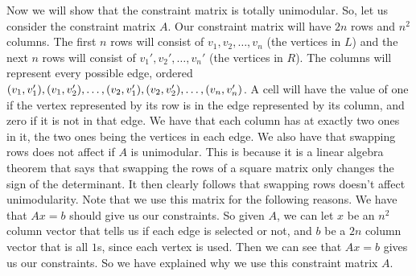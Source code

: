\documentclass{article}
\begin{document}
\begin{description}
        Now we will show that the constraint matrix is totally unimodular. So,
        let us consider the constraint matrix $A$. Our constraint matrix will
        have $2n$ rows and $n^2$ columns. The first $n$ rows will consist of
        $v_1, v_2, \dots, v_n$ (the vertices in $L$) and the next $n$ rows will consist of
        $v_1', v_2', \dots, v_n'$ (the vertices in $R$). The columns will represent
        every possible edge, ordered $(v_1, v_1'), (v_1, v_2'), \dots, (v_2,
        v_1'), (v_2, v_2'), \\* \dots, (v_n, v_n')$. A cell will have the value of one if
        the vertex represented by its row is in the edge represented by its
        column, and zero if it is not in that edge. We have that each column has
        at exactly two ones in it, the two ones being the vertices in each edge.
        We also have that swapping rows does not affect
        if $A$ is unimodular. This is because it is a linear algebra theorem that says that
        swapping the rows of a square matrix only changes the sign of the
        determinant. It then clearly follows that swapping rows doesn't affect
        unimodularity. Note that we use this matrix for the following reasons.
        We have that $Ax = b$ should give us our constraints. So given $A$, we
        can let $x$ be an $n^2$ column vector that tells us if each edge is
        selected or not, and $b$ be a $2n$ column vector that is all $1$s, since
        each vertex is used. Then we can see that $Ax = b$
        gives us our constraints. So we have explained why we use this constraint
        matrix $A$.


\end{description}
\end{document}
